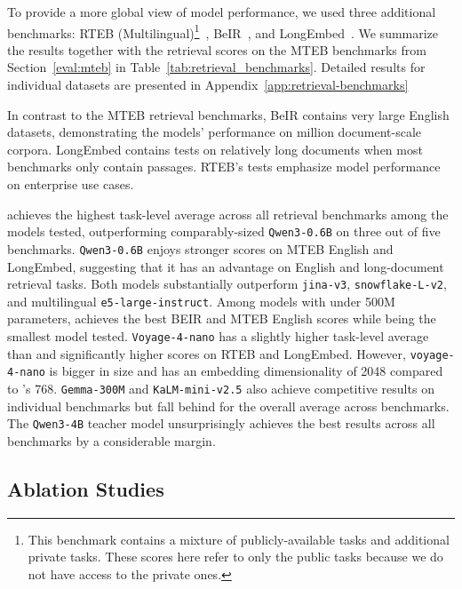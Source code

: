 \documentclass[11pt]{article}
\begin{document}
To provide a more global view of model performance, we used three additional benchmarks: RTEB (Multilingual)\footnote{This benchmark contains a mixture of publicly-available tasks and additional private tasks. These scores here refer to only the public tasks because we do not have access to the private ones.}~\cite{liu2025rteb}, BeIR~\cite{thakur2beir}, and LongEmbed~\cite{zhu2024longembed}. We summarize the results together with the retrieval scores on the MTEB benchmarks from Section~\ref{eval:mteb} in Table~\ref{tab:retrieval_benchmarks}.
Detailed results for individual datasets are presented in Appendix~\ref{app:retrieval-benchmarks}

In contrast to the MTEB retrieval benchmarks, BeIR contains very large English datasets, demonstrating the models' performance on million document-scale corpora. LongEmbed contains tests on relatively long documents when most benchmarks only contain passages. RTEB's tests emphasize model performance on enterprise use cases.

\JEmbeddingVFiveTextSmall{} achieves the highest task-level average across all retrieval benchmarks among the models tested, outperforming comparably-sized \texttt{Qwen3-0.6B} on three out of five benchmarks. \texttt{Qwen3-0.6B} enjoys stronger scores on MTEB English and LongEmbed, suggesting that it has an advantage on English and long-document retrieval tasks. Both \JEmbeddingVFiveText{} models substantially outperform \texttt{jina-v3}, \texttt{snowflake-L-v2}, and multilingual \texttt{e5-large-instruct}. Among models with under 500M parameters, \JEmbeddingVFiveTextNano{} achieves the best BEIR and MTEB English scores while being the smallest model tested. \texttt{Voyage-4-nano} has a slightly higher task-level average than \JEmbeddingVFiveTextNano{}and significantly higher scores on RTEB and LongEmbed. However, \texttt{voyage-4-nano} is bigger in size and has an embedding dimensionality of 2048 compared to \JEmbeddingVFiveTextNano{}'s 768. \texttt{Gemma-300M} and \texttt{KaLM-mini-v2.5} also achieve competitive results on individual benchmarks but fall behind for the overall average across benchmarks. The \texttt{Qwen3-4B} teacher model unsurprisingly achieves the best results across all benchmarks by a considerable margin.

\subsection{Ablation Studies}
\label{sec:ablations}
\end{document}
